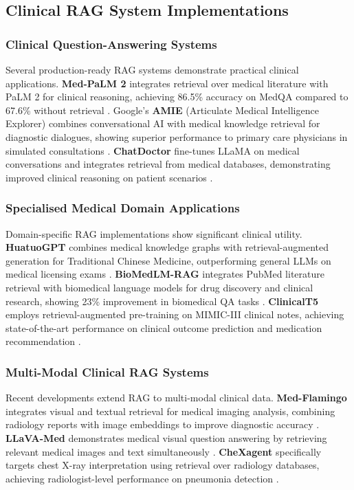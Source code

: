 \subsection{Clinical RAG System Implementations}

\subsubsection{Clinical Question-Answering Systems}
Several production-ready RAG systems demonstrate practical clinical applications. \textbf{Med-PaLM 2} integrates retrieval over medical literature with PaLM 2 for clinical reasoning, achieving 86.5\% accuracy on MedQA compared to 67.6\% without retrieval \citep{singhal2024medpalm2}. Google's \textbf{AMIE} (Articulate Medical Intelligence Explorer) combines conversational AI with medical knowledge retrieval for diagnostic dialogues, showing superior performance to primary care physicians in simulated consultations \citep{tu2024amie}. \textbf{ChatDoctor} fine-tunes LLaMA on medical conversations and integrates retrieval from medical databases, demonstrating improved clinical reasoning on patient scenarios \citep{li2023chatdoctor}.

\subsubsection{Specialised Medical Domain Applications}
Domain-specific RAG implementations show significant clinical utility. \textbf{HuatuoGPT} combines medical knowledge graphs with retrieval-augmented generation for Traditional Chinese Medicine, outperforming general LLMs on medical licensing exams \citep{zhang2023huatuogpt}. \textbf{BioMedLM-RAG} integrates PubMed literature retrieval with biomedical language models for drug discovery and clinical research, showing 23\% improvement in biomedical QA tasks \citep{bolton2024biomedlm}. \textbf{ClinicalT5} employs retrieval-augmented pre-training on MIMIC-III clinical notes, achieving state-of-the-art performance on clinical outcome prediction and medication recommendation \citep{lehman2023clinicalt5}.

\subsubsection{Multi-Modal Clinical RAG Systems}
Recent developments extend RAG to multi-modal clinical data. \textbf{Med-Flamingo} integrates visual and textual retrieval for medical imaging analysis, combining radiology reports with image embeddings to improve diagnostic accuracy \citep{moor2023medflamingo}. \textbf{LLaVA-Med} demonstrates medical visual question answering by retrieving relevant medical images and text simultaneously \citep{li2023llavamed}. \textbf{CheXagent} specifically targets chest X-ray interpretation using retrieval over radiology databases, achieving radiologist-level performance on pneumonia detection \citep{chen2024chexagent}.

